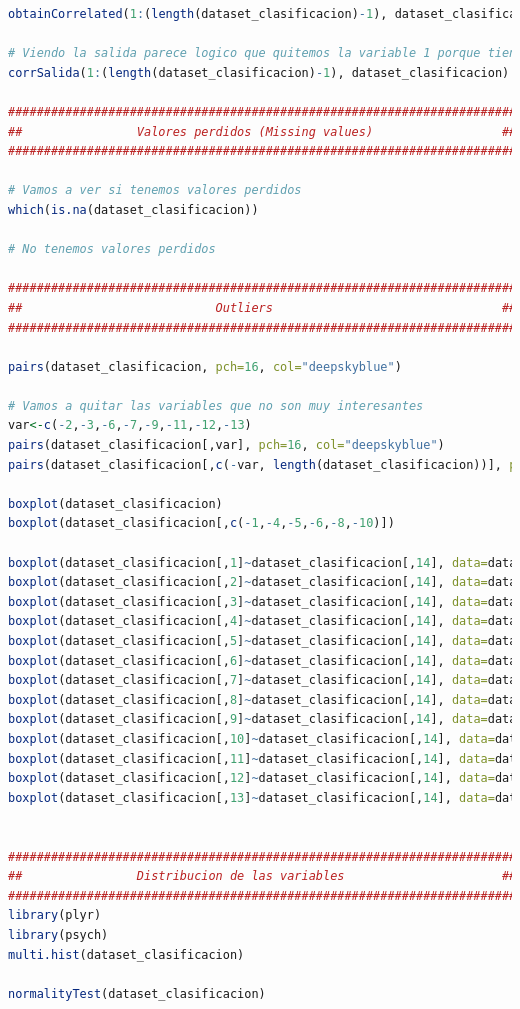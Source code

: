 \documentclass[12pt,a4paper]{article}
\begin{document}
\begin{lstlisting}[basicstyle=\tiny, language=R]
obtainCorrelated(1:(length(dataset_clasificacion)-1), dataset_clasificacion, threshold = -1)

# Viendo la salida parece logico que quitemos la variable 1 porque tiene una correlacion baja
corrSalida(1:(length(dataset_clasificacion)-1), dataset_clasificacion)

#######################################################################
##                Valores perdidos (Missing values)                  ##
#######################################################################

# Vamos a ver si tenemos valores perdidos
which(is.na(dataset_clasificacion))

# No tenemos valores perdidos

#######################################################################
##                           Outliers                                ##
#######################################################################

pairs(dataset_clasificacion, pch=16, col="deepskyblue")

# Vamos a quitar las variables que no son muy interesantes
var<-c(-2,-3,-6,-7,-9,-11,-12,-13)
pairs(dataset_clasificacion[,var], pch=16, col="deepskyblue")
pairs(dataset_clasificacion[,c(-var, length(dataset_clasificacion))], pch=16, col="deepskyblue")

boxplot(dataset_clasificacion)
boxplot(dataset_clasificacion[,c(-1,-4,-5,-6,-8,-10)])

boxplot(dataset_clasificacion[,1]~dataset_clasificacion[,14], data=dataset_clasificacion)
boxplot(dataset_clasificacion[,2]~dataset_clasificacion[,14], data=dataset_clasificacion)
boxplot(dataset_clasificacion[,3]~dataset_clasificacion[,14], data=dataset_clasificacion)
boxplot(dataset_clasificacion[,4]~dataset_clasificacion[,14], data=dataset_clasificacion)
boxplot(dataset_clasificacion[,5]~dataset_clasificacion[,14], data=dataset_clasificacion)
boxplot(dataset_clasificacion[,6]~dataset_clasificacion[,14], data=dataset_clasificacion)
boxplot(dataset_clasificacion[,7]~dataset_clasificacion[,14], data=dataset_clasificacion)
boxplot(dataset_clasificacion[,8]~dataset_clasificacion[,14], data=dataset_clasificacion)
boxplot(dataset_clasificacion[,9]~dataset_clasificacion[,14], data=dataset_clasificacion)
boxplot(dataset_clasificacion[,10]~dataset_clasificacion[,14], data=dataset_clasificacion)
boxplot(dataset_clasificacion[,11]~dataset_clasificacion[,14], data=dataset_clasificacion)
boxplot(dataset_clasificacion[,12]~dataset_clasificacion[,14], data=dataset_clasificacion)
boxplot(dataset_clasificacion[,13]~dataset_clasificacion[,14], data=dataset_clasificacion)


#######################################################################
##                Distribucion de las variables                      ##
#######################################################################
library(plyr)
library(psych)
multi.hist(dataset_clasificacion)

normalityTest(dataset_clasificacion)


\end{lstlisting}
\end{document}

